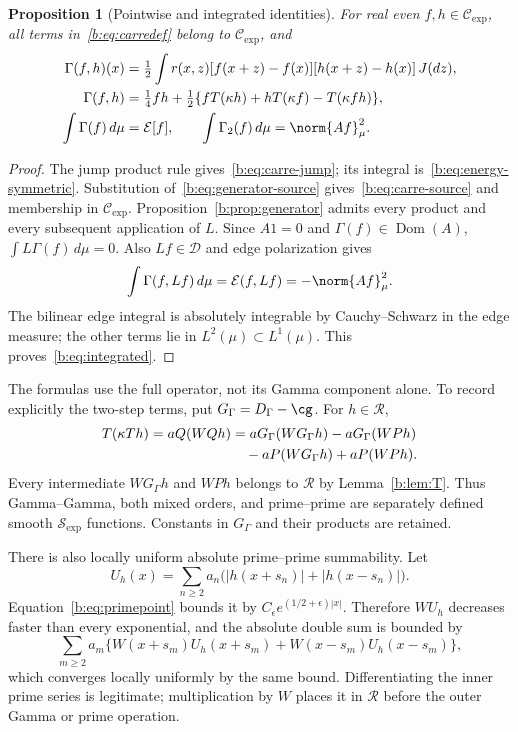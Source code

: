 \documentclass[11pt,a4paper]{article}
\numberwithin{equation}{section}
\newtheorem{proposition}[theorem]{Proposition}
\theoremstyle{definition}\newtheorem{definition}[theorem]{Definition}
\theoremstyle{remark}\newtheorem{remark}[theorem]{Remark}
\newcommand{\E}{\mathcal E}\newcommand{\D}{\mathcal D}
\newcommand{\dom}{\operatorname{Dom}}\newcommand{\Var}{\operatorname{Var}}
\newcommand{\RR}{\mathscr R}\newcommand{\SSS}{\mathcal S_{\!\exp}}\newcommand{\CE}{\mathcal C_{\exp}}
\begin{document}
\begin{proposition}[Pointwise and integrated identities]\label{b:prop:carre}
For real even $f,h\in\CE$, all terms in~\eqref{b:eq:carredef} belong to $\CE$, and
\begin{align}
 \Gamma(f,h)(x)&=\tfrac12\int r(x,z)
   [f(x+z)-f(x)][h(x+z)-h(x)]\,J(dz),\label{b:eq:carre-jump}\\
 \Gamma(f,h)&=\tfrac14fh+\tfrac12
   \{fT(\kappa h)+hT(\kappa f)-T(\kappa fh)\},\label{b:eq:carre-source}\\
 \int\Gamma(f)\,d\mu&=\E[f],\qquad
 \int\Gamma_2(f)\,d\mu=\norm{Af}_\mu^2.\label{b:eq:integrated}
\end{align}
\end{proposition}
\begin{proof}
The jump product rule gives~\eqref{b:eq:carre-jump}; its integral is~\eqref{b:eq:energy-symmetric}. Substitution of~\eqref{b:eq:generator-source} gives~\eqref{b:eq:carre-source} and membership in $\CE$. Proposition~\ref{b:prop:generator} admits every product and every subsequent application of $L$. Since $A1=0$ and $\Gamma(f)\in\dom(A)$,
$\int L\Gamma(f)\,d\mu=0$. Also $Lf\in\D$ and edge polarization gives
\[
 \int\Gamma(f,Lf)\,d\mu=\E(f,Lf)=-\norm{Af}_\mu^2.
\]
The bilinear edge integral is absolutely integrable by Cauchy--Schwarz in the edge measure; the other terms lie in $L^2(\mu)\subset L^1(\mu)$. This proves~\eqref{b:eq:integrated}.
\end{proof}

The formulas use the full operator, not its Gamma component alone. To record explicitly the two-step terms, put $G_\Gamma=D_\Gamma-\cg$. For $h\in\RR$,
\begin{align}\label{b:eq:mixed}
 T(\kappa Th)=aQ(WQh)
 &=aG_\Gamma(WG_\Gamma h)-aG_\Gamma(WPh)\notag\\
 &\quad-aP(WG_\Gamma h)+aP(WPh).
\end{align}
Every intermediate $WG_\Gamma h$ and $WPh$ belongs to $\RR$ by Lemma~\ref{b:lem:T}. Thus Gamma--Gamma, both mixed orders, and prime--prime are separately defined smooth $\SSS$ functions. Constants in $G_\Gamma$ and their products are retained.

There is also locally uniform absolute prime--prime summability. Let
\[
 U_h(x)=\sum_{n\ge2}a_n\bigl(|h(x+s_n)|+|h(x-s_n)|\bigr).
\]
Equation~\eqref{b:eq:primepoint} bounds it by $C_\epsilon e^{(1/2+\epsilon)|x|}$. Therefore $WU_h$ decreases faster than every exponential, and the absolute double sum is bounded by
\[
 \sum_{m\ge2}a_m\{W(x+s_m)U_h(x+s_m)+W(x-s_m)U_h(x-s_m)\},
\]
which converges locally uniformly by the same bound. Differentiating the inner prime series is legitimate; multiplication by $W$ places it in $\RR$ before the outer Gamma or prime operation.
\end{document}
